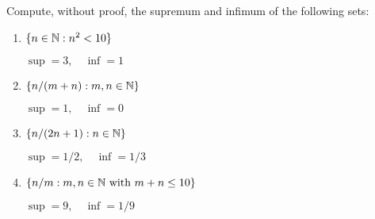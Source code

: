\begin{problem}\label{prob:sup-inf-practice}
  Compute, without proof, the supremum and infimum of the following sets:
  \begin{enumerate}[label=(\alph*)]
    \item $\{n \in \mathbb{N} : n^2 < 10\}$
      
    $\sup = 3, \quad \inf = 1$

    \item $\{n/(m + n) : m, n \in \mathbb{N}\}$

    $\sup = 1, \quad \inf = 0$

    \item $\{n/(2n + 1) : n \in \mathbb{N}\}$

    $\sup = 1/2, \quad \inf = 1/3$

    \item $\{n/m : m, n \in \mathbb{N} \text{ with } m + n \leq 10\}$

    $\sup = 9, \quad \inf = 1/9$
  \end{enumerate}
\end{problem}

